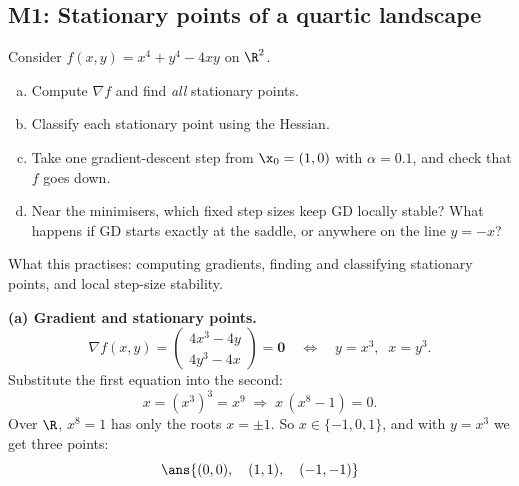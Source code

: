 \subsection{M1: Stationary points of a quartic landscape}

\begin{frame}{}
  \begin{probbox}
    Consider \(\displaystyle f(x,y) = x^4 + y^4 - 4xy\) on \(\R^2\).
    \begin{enumerate}[(a)]
      \item Compute $\nabla f$ and find \emph{all} stationary points.
      \item Classify each stationary point using the Hessian.
      \item Take one gradient-descent step from $\x_0=(1,0)$ with $\alpha = 0.1$,
            and check that $f$ goes down.
      \item Near the minimisers, which fixed step sizes keep GD locally stable?
            What happens if GD starts exactly at the saddle, or anywhere on the line $y=-x$?
    \end{enumerate}
  \end{probbox}
  \footnotesize\textcolor{mGrey}{What this practises: computing gradients, finding and classifying stationary points,
  and local step-size stability.}
\end{frame}

\begin{frame}{}
  \textbf{(a) Gradient and stationary points.}
  \[
    \nabla f(x,y) = \begin{pmatrix} 4x^3 - 4y \\ 4y^3 - 4x \end{pmatrix} = \mathbf 0
    \quad\Longleftrightarrow\quad y = x^3, \;\; x = y^3 .
  \]
  Substitute the first equation into the second:
  \[
    x = (x^3)^3 = x^9 \;\Longrightarrow\; x\,(x^8 - 1) = 0 .
  \]
  Over $\R$, $x^8 = 1$ has only the roots $x = \pm 1$. So $x \in \{-1, 0, 1\}$, and with $y = x^3$ we get three points:
  \[
    \ans{(0,0),\quad (1,1),\quad (-1,-1)}
  \]
\end{frame}

